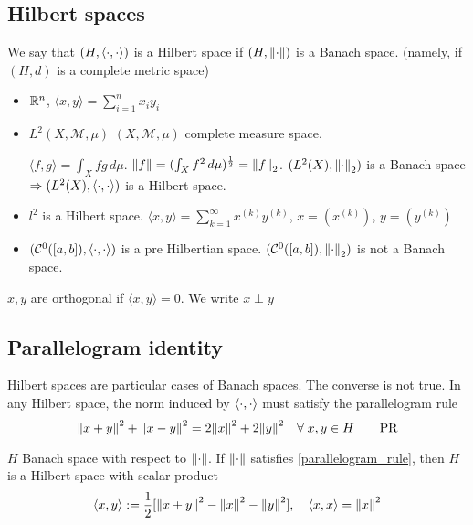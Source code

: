 \subsection{Hilbert spaces}
\begin{definition}
    We say that \((H, \langle \cdot,\cdot \rangle)\) is a Hilbert space if \((H, \norm{\cdot})\) is a Banach space. (namely, if \((H, d)\) is a complete metric space)
\end{definition}
\begin{example}
    \begin{itemize}
        \item \(\mathbb{R}^n\), \(\langle x, y\rangle = \sum_{i=1}^n x_i y_i\)
        \item \(L^2(X, \mathcal{M}, \mu)\) \((X, \mathcal{M}, \mu)\) complete measure space. 
        
        \(\langle f, g\rangle = \int_X fg \, d\mu\). \(\norm{f} = (\int_X f^2 \, d\mu)^\frac{1}{2} = \norm{f}_2\). \((L^2(X), \norm{\cdot}_2)\) is a Banach space \(\Rightarrow (L^2(X), \langle \cdot,\cdot \rangle)\) is a Hilbert space.
        \item \(l^2\) is a Hilbert space. \(\langle x, y\rangle = \sum_{k=1}^\infty x^{(k)} y^{(k)}\), \(x = (x^{(k)})\), \(y = (y^{(k)})\)
        \item \((\mathcal{C}^0([a, b]), \langle \cdot,\cdot \rangle )\) is a pre Hilbertian space. \((\mathcal{C}^0([a, b]), \norm{\cdot}_2 )\) is not a Banach space. 
    \end{itemize}
\end{example}
\begin{definition}
    \(x, y\) are orthogonal if \(\langle x, y \rangle=0\). We write \(x \perp y\)
\end{definition}
\subsection{Parallelogram identity}
\begin{remark}
    Hilbert spaces are particular cases of Banach spaces. The converse is not true. In any Hilbert space, the norm induced by \(\langle \cdot,\cdot \rangle\) must satisfy the parallelogram rule
        \begin{equation}\label{parallelogram_rule}
            \norm{x+y}^2 + \norm{x-y}^2 = 2\norm{x}^2 + 2\norm{y}^2 \quad \forall \; x, y \in H \tag*{PR}
        \end{equation}
\end{remark}

\begin{proposition}
    \(H\) Banach space with respect to \(\norm{\cdot}\). If \(\norm{\cdot}\) satisfies \eqref{parallelogram_rule}, then \(H\) is a Hilbert space with scalar product 
    \[
        \langle x, y \rangle := \frac{1}{2} [\norm{x+y}^2 - \norm{x}^2 - \norm{y}^2], \quad \langle x,x \rangle = \norm{x}^2
    \]
\end{proposition}


